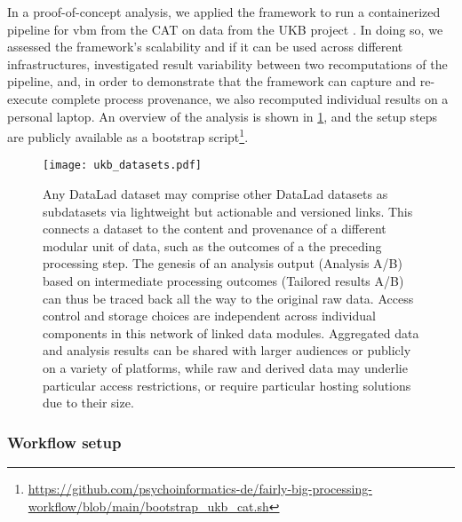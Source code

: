 In a proof-of-concept analysis, we applied the framework to run a containerized pipeline for \gls{vbm} \citep{ashburner2000voxel} from the \gls{CAT} \citep{gaser} on data from the UKB project \citep[][comprising 76 TB in 43 million files under strict usage constraints]{matthews2015uk}.
In doing so, we assessed the framework's scalability and if it can be used across different infrastructures, investigated result variability between two recomputations of the pipeline, and, in order to demonstrate that the framework can capture and re-execute complete process provenance, we also recomputed individual results on a personal laptop.
An overview of the analysis is shown in \cref{fig:fairly_datasets}, and the setup steps are publicly available as a bootstrap script\footnote{\url{https://github.com/psychoinformatics-de/fairly-big-processing-workflow/blob/main/bootstrap_ukb_cat.sh}}.

\begin{figure}
	\centering
	\texttt{[image: ukb\_datasets.pdf]}
	\caption[Overview of DataLad dataset linkage through processing and reuse]{Any DataLad dataset may comprise other DataLad datasets as subdatasets via lightweight but actionable and versioned links. This connects a dataset to the content and provenance of a different modular unit of data, such as the outcomes of a the preceding processing step. The genesis of an analysis output (Analysis A/B) based on intermediate processing outcomes (Tailored results A/B) can thus be traced back all the way to the original raw data. Access control and storage choices are independent across individual components in this network of linked data modules. Aggregated data and analysis results can be shared with larger audiences or publicly on a variety of platforms, while raw and derived data may underlie particular access restrictions, or require particular hosting solutions due to their size.}
	\label{fig:fairly_datasets}
\end{figure}

\subsubsection{Workflow setup}

